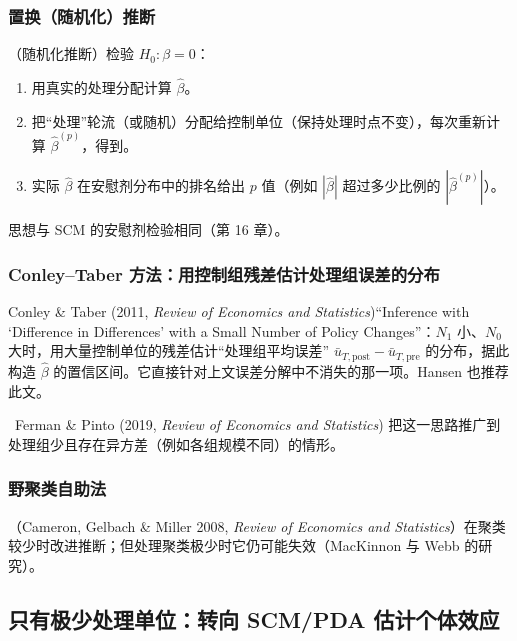 \subsubsection{置换（随机化）推断}

\begin{method}[置换推断的步骤]
（随机化推断）检验 $H_0:\beta=0$：
\begin{enumerate}
  \item 用真实的处理分配计算 $\hat\beta$。
  \item 把“处理”轮流（或随机）分配给控制单位（保持处理时点不变），每次重新计算 $\hat\beta^{(p)}$，得到。
  \item 实际 $\hat\beta$ 在安慰剂分布中的排名给出 $p$ 值（例如 $|\hat\beta|$ 超过多少比例的 $|\hat\beta^{(p)}|$）。
\end{enumerate}
思想与 SCM 的安慰剂检验相同（第 16 章）。
\end{method}

\subsubsection{Conley--Taber 方法：用控制组残差估计处理组误差的分布}

Conley \& Taber (2011, \textit{Review of Economics and Statistics})“Inference with ‘Difference in Differences’ with a Small Number of Policy Changes”：$N_1$ 小、$N_0$ 大时，用大量控制单位的残差估计“处理组平均误差” $\bar u_{T,\mathrm{post}}-\bar u_{T,\mathrm{pre}}$ 的分布，据此构造 $\hat\beta$ 的置信区间。它直接针对上文误差分解中不消失的那一项。Hansen 也推荐此文。

\tagext\ Ferman \& Pinto (2019, \textit{Review of Economics and Statistics}) 把这一思路推广到处理组少且存在异方差（例如各组规模不同）的情形。

\subsubsection{野聚类自助法}

（Cameron, Gelbach \& Miller 2008, \textit{Review of Economics and Statistics}）在聚类较少时改进推断；但处理聚类极少时它仍可能失效（MacKinnon 与 Webb 的研究）。

\subsection{只有极少处理单位：转向 SCM/PDA 估计个体效应}

